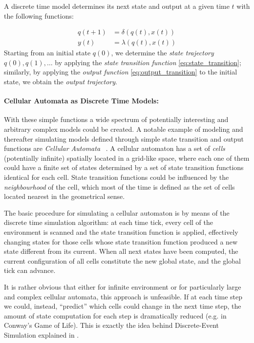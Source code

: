 A discrete time model determines its next state and output at a given time
$t$ with the following functions:

\begin{subequations}
	\begin{align}
		q(t + 1) & = \delta(q(t), x(t)) \label{eq:state_transition}   \\
		y(t)     & = \lambda(q(t), x(t)) \label{eq:output_transition}
	\end{align}
\end{subequations}
Starting from an initial state $q(0)$, we determine the \emph{state trajectory}
$q(0), q(1), \dots$ by applying the \emph{state transition function}
\eqref{eq:state_transition}; similarly, by applying the \emph{output function}
\eqref{eq:output_transition} to the initial state, we obtain the \emph{output
	trajectory}.

\paragraph{Cellular Automata as Discrete Time Models:}

With these simple functions a wide spectrum of potentially interesting and
arbitrary complex models could be created. A notable example of modeling and
thereafter simulating models defined through simple state transition and output
functions are \emph{Cellular Automata} ~\cite{Neumann:66}. A cellular automaton
has a set of \emph{cells} (potentially infinite) spatially located in a
grid-like space, where each one of them could have a finite set of states
determined by a set of state transition functions identical for each cell.
State transition functions could be influenced by the \emph{neighbourhood} of
the cell, which most of the time is defined as the set of cells located nearest
in the geometrical sense.

The basic procedure for simulating a cellular automaton is by means of the
discrete time simulation algorithm: at each time tick, every cell of the
environment is scanned and the state transition function is applied,
effectively changing states for those cells whose state transition function
produced a new state different from its current. When all next states have been
computed, the current configuration of all cells constitute the new global
state, and the global tick can advance.

It is rather obvious that either for infinite environment or for particularly
large and complex cellular automata, this approach is unfeasible. If at each
time step we could, instead, ``predict'' which cells could change in the next
time step, the amount of state computation for each step is dramatically
reduced (e.g. in Conway's Game of Life). This is exactly the idea behind
Discrete-Event Simulation explained in .

